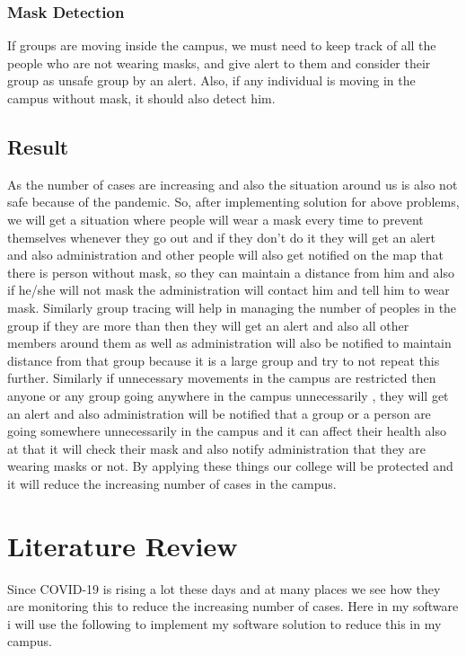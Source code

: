 \documentclass[10pt,twocolumn,letterpaper]{article}
\begin{document}
\subsubsection{Mask Detection}
If groups are moving inside the campus, we must need to keep track of all the people who are not wearing masks, and give alert to them and consider their group as unsafe group by an alert. Also, if any individual is moving in the campus without mask, it should also detect him.


\subsection{Result}
As the number of cases are increasing and also the situation around us is also not safe because of the pandemic. So, after implementing solution for above problems, we will get a situation where people will wear a mask every time to prevent themselves whenever they go out and if they don't do it they will get an alert and also administration and other people will also get notified on the map that there is person without mask, so they can maintain a distance from him and also if he/she will not mask the administration will contact him and tell him to wear mask. Similarly group tracing will help in managing the number of peoples in the group if they are more than then they will get an alert and also all other members around them as well as administration will also be notified to maintain distance from that group because it is a large group and try to not repeat this further. Similarly if unnecessary movements in the campus are restricted then anyone or any group going anywhere in the campus unnecessarily , they will get an alert and also administration will be notified that a group or a person are going somewhere unnecessarily in the campus and it can affect their health also at that it will check their mask and also notify administration that they are wearing masks or not. By applying these things our college will be protected and it will reduce the increasing number of cases in the campus.



\section{Literature Review}

Since COVID-19 is rising a lot these days and at many places we see how they are monitoring this to reduce the increasing number of cases. Here in my software i will use the following to implement my software solution to reduce this in my campus.
\end{document}
